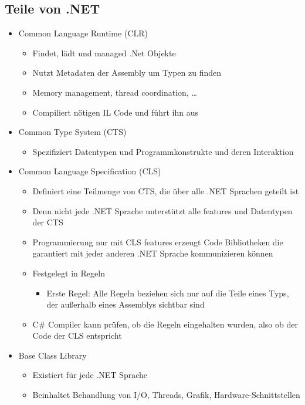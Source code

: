 \subsection{Teile von .NET}
\begin{itemize}
\item Common Language Runtime (CLR)
\begin{itemize}
\item Findet, lädt und managed .Net Objekte
\item Nutzt Metadaten der Assembly um Typen zu finden
\item Memory management, thread coordination, …
\item Compiliert nötigen IL Code und führt ihn aus
\end{itemize}
\item Common Type System (CTS)
\begin{itemize}
\item Spezifiziert Datentypen und Programmkonstrukte und deren Interaktion
\end{itemize}
\item Common Language Specification (CLS)
\begin{itemize}
\item Definiert eine Teilmenge von CTS, die über alle .NET Sprachen geteilt ist
\item Denn nicht jede .NET Sprache unterstützt alle features und Datentypen der CTS
\item Programmierung nur mit CLS features erzeugt Code Bibliotheken die garantiert mit jeder anderen .NET Sprache kommunizieren können
\item Festgelegt in Regeln
\begin{itemize}
\item Erste Regel: Alle Regeln beziehen sich nur auf die Teile eines Typs, der außerhalb eines Assemblys sichtbar sind
\end{itemize}
\item C\# Compiler kann prüfen, ob die Regeln eingehalten wurden, also ob der Code der CLS entspricht
\end{itemize}
\item Base Class Library
\begin{itemize}
\item Existiert für jede .NET Sprache
\item Beinhaltet Behandlung von I/O, Threads, Grafik, Hardware-Schnittstellen
\end{itemize}
\end{itemize}

